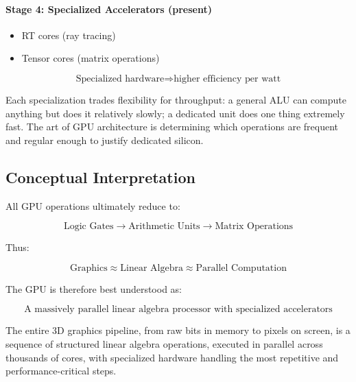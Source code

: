 \documentclass[11pt]{article}
\begin{document}
\paragraph{Stage 4: Specialized Accelerators (present)}

\begin{itemize}
    \item RT cores (ray tracing)
    \item Tensor cores (matrix operations)
\end{itemize}

\begin{equation}
    \text{Specialized hardware} \Rightarrow \text{higher efficiency per watt}
\end{equation}

Each specialization trades flexibility for throughput: a general ALU can compute anything but does it relatively slowly; a dedicated unit does one thing extremely fast. The art of GPU architecture is determining which operations are frequent and regular enough to justify dedicated silicon.


\subsection{Conceptual Interpretation}

All GPU operations ultimately reduce to:

\begin{equation}
    \text{Logic Gates} \rightarrow \text{Arithmetic Units} \rightarrow \text{Matrix Operations}
\end{equation}

Thus:

\begin{equation}
    \text{Graphics} \approx \text{Linear Algebra} \approx \text{Parallel Computation}
\end{equation}

The GPU is therefore best understood as:

\begin{equation}
    \text{A massively parallel linear algebra processor with specialized accelerators}
\end{equation}

The entire 3D graphics pipeline, from raw bits in memory to pixels on screen, is a sequence of structured linear algebra operations, executed in parallel across thousands of cores, with specialized hardware handling the most repetitive and performance-critical steps.
\end{document}
